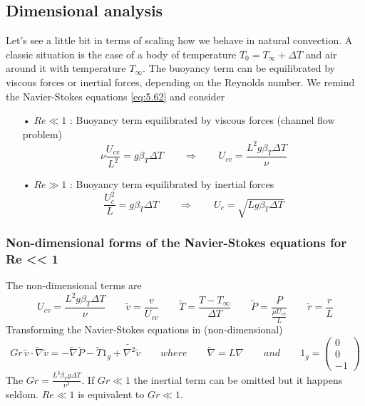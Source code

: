 \subsection{Dimensional analysis}
	Let's see a little bit in terms of scaling how we behave in natural convection. A classic situation is the case of a body of temperature $T_0 = T_\infty + \Delta T$ and air around it with temperature $T_\infty$. The buoyancy term can be equilibrated by viscous forces or inertial forces, depending on the Reynolds number. We remind the Navier-Stokes equations \ref{eq:5.62} and consider \\
	\begin{itemize}
		\item[•] $Re \ll 1$ : Buoyancy term equilibrated by viscous forces (channel flow problem)
		\begin{equation}
			\nu \frac{U_{cv}}{L^2} = g \beta _T \Delta T \qquad \Rightarrow \qquad U_{cv} = \frac{L^2 g \beta _T \Delta T}{\nu}
		\end{equation}
		
		\item[•] $Re \gg 1$ : Buoyancy term equilibrated by inertial forces
		\begin{equation}
			\frac{U^2_{c}}{L} = g\beta _T \Delta T \qquad \Rightarrow \qquad U_c = \sqrt{L g \beta _T \Delta T}
		\end{equation}
	\end{itemize}
	
	\subsubsection{Non-dimensional forms of the Navier-Stokes equations for Re << 1}
	The non-dimensional terms are
	\begin{equation}
		U_{cv} = \frac{L^2 g \beta _T \Delta T}{\nu} \qquad \tilde{v} = \frac{v}{U_{cv}} \qquad \tilde{T} = \frac{T-T_\infty}{\Delta T} \qquad \tilde{P} = \frac{P}{\frac{\mu U_{cv}}{L}} \qquad \tilde{r} = \frac{r}{L}
	\end{equation}
	Transforming the Navier-Stokes equations in (non-dimensional)
	\begin{equation}
		Gr \, \tilde{v} \cdot \tilde{\nabla} \tilde{v} = - \tilde{\nabla} \tilde{P} - \tilde{T} 1_g + \tilde{\nabla ^2} \tilde{v} \qquad where \qquad \tilde{\nabla} = L\nabla \qquad and \qquad 1_g = \left( 
		\begin{array}{c}
		0 \\ 
		0 \\ 
		-1
		\end{array} 
		\right)
	\end{equation}
	The $Gr = \frac{L^3 \beta _T g \Delta T}{\nu ^2}$. If $Gr \ll 1$ the inertial term can be omitted but it happens seldom. $Re \ll 1$ is equivalent to $Gr \ll 1$. 
	
